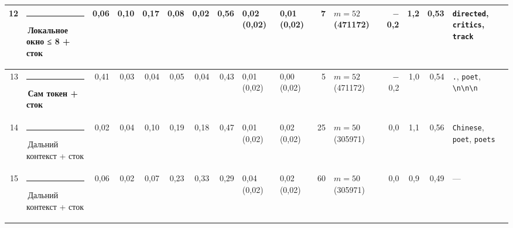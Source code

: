\documentclass[10pt]{article}
\begin{document}
\begin{minipage}{\linewidth}
\begin{center}
{\begin{tabular}{|r|l|r|r|r|r|r|r|l|l|r|l|r|r|r|l|}
12 & \textcolor[HTML]{1BAF7A}{\rule{0.62em}{0.62em}}\,\textbf{Локальное окно ≤ 8 + сток} & 0,06 & 0,10 & 0,17 & 0,08 & 0,02 & 0,56 & 0,02 (0,02) & 0,01 (0,02) & 7 & $m{=}52$ (471172) & $-$0,2 & 1,2 & 0,53 & \texttt{\textvisiblespace{}directed}, \texttt{\textvisiblespace{}critics}, \texttt{\textvisiblespace{}track} \\ \hline
13 & \textcolor[HTML]{2A78D6}{\rule{0.62em}{0.62em}}\,\textbf{Сам токен + сток} & 0,41 & 0,03 & 0,04 & 0,05 & 0,04 & 0,43 & 0,01 (0,02) & 0,00 (0,02) & 5 & $m{=}52$ (471172) & $-$0,2 & 1,0 & 0,54 & \texttt{\textvisiblespace{}.}, \texttt{\textvisiblespace{}poet}, \texttt{\textvisiblespace{}\textbackslash{}n\textbackslash{}n\textbackslash{}n} \\ \hline
14 & \textcolor[HTML]{C3C2B7}{\rule{0.62em}{0.62em}}\,Дальний контекст + сток & 0,02 & 0,04 & 0,10 & 0,19 & 0,18 & 0,47 & 0,01 (0,02) & 0,02 (0,02) & 25 & $m{=}50$ (305971) & 0,0 & 1,1 & 0,56 & \texttt{\textvisiblespace{}Chinese}, \texttt{\textvisiblespace{}poet}, \texttt{\textvisiblespace{}poets} \\ \hline
15 & \textcolor[HTML]{C3C2B7}{\rule{0.62em}{0.62em}}\,Дальний контекст + сток & 0,06 & 0,02 & 0,07 & 0,23 & 0,33 & 0,29 & 0,04 (0,02) & 0,02 (0,02) & 60 & $m{=}50$ (305971) & 0,0 & 0,9 & 0,49 & — \\ \hline
\hline\end{tabular}}\end{center}
\end{minipage}
\par\vspace{0.4em}
\end{document}
